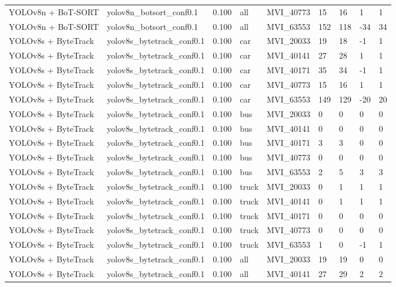 \begin{tabular}{lllllllll}
YOLOv8n + BoT-SORT & yolov8n\_botsort\_conf0.1 & 0.100 & all & MVI\_40773 & 15 & 16 & 1 & 1 \\
YOLOv8n + BoT-SORT & yolov8n\_botsort\_conf0.1 & 0.100 & all & MVI\_63553 & 152 & 118 & -34 & 34 \\
YOLOv8s + ByteTrack & yolov8s\_bytetrack\_conf0.1 & 0.100 & car & MVI\_20033 & 19 & 18 & -1 & 1 \\
YOLOv8s + ByteTrack & yolov8s\_bytetrack\_conf0.1 & 0.100 & car & MVI\_40141 & 27 & 28 & 1 & 1 \\
YOLOv8s + ByteTrack & yolov8s\_bytetrack\_conf0.1 & 0.100 & car & MVI\_40171 & 35 & 34 & -1 & 1 \\
YOLOv8s + ByteTrack & yolov8s\_bytetrack\_conf0.1 & 0.100 & car & MVI\_40773 & 15 & 16 & 1 & 1 \\
YOLOv8s + ByteTrack & yolov8s\_bytetrack\_conf0.1 & 0.100 & car & MVI\_63553 & 149 & 129 & -20 & 20 \\
YOLOv8s + ByteTrack & yolov8s\_bytetrack\_conf0.1 & 0.100 & bus & MVI\_20033 & 0 & 0 & 0 & 0 \\
YOLOv8s + ByteTrack & yolov8s\_bytetrack\_conf0.1 & 0.100 & bus & MVI\_40141 & 0 & 0 & 0 & 0 \\
YOLOv8s + ByteTrack & yolov8s\_bytetrack\_conf0.1 & 0.100 & bus & MVI\_40171 & 3 & 3 & 0 & 0 \\
YOLOv8s + ByteTrack & yolov8s\_bytetrack\_conf0.1 & 0.100 & bus & MVI\_40773 & 0 & 0 & 0 & 0 \\
YOLOv8s + ByteTrack & yolov8s\_bytetrack\_conf0.1 & 0.100 & bus & MVI\_63553 & 2 & 5 & 3 & 3 \\
YOLOv8s + ByteTrack & yolov8s\_bytetrack\_conf0.1 & 0.100 & truck & MVI\_20033 & 0 & 1 & 1 & 1 \\
YOLOv8s + ByteTrack & yolov8s\_bytetrack\_conf0.1 & 0.100 & truck & MVI\_40141 & 0 & 1 & 1 & 1 \\
YOLOv8s + ByteTrack & yolov8s\_bytetrack\_conf0.1 & 0.100 & truck & MVI\_40171 & 0 & 0 & 0 & 0 \\
YOLOv8s + ByteTrack & yolov8s\_bytetrack\_conf0.1 & 0.100 & truck & MVI\_40773 & 0 & 0 & 0 & 0 \\
YOLOv8s + ByteTrack & yolov8s\_bytetrack\_conf0.1 & 0.100 & truck & MVI\_63553 & 1 & 0 & -1 & 1 \\
YOLOv8s + ByteTrack & yolov8s\_bytetrack\_conf0.1 & 0.100 & all & MVI\_20033 & 19 & 19 & 0 & 0 \\
YOLOv8s + ByteTrack & yolov8s\_bytetrack\_conf0.1 & 0.100 & all & MVI\_40141 & 27 & 29 & 2 & 2 \\

\end{tabular}
